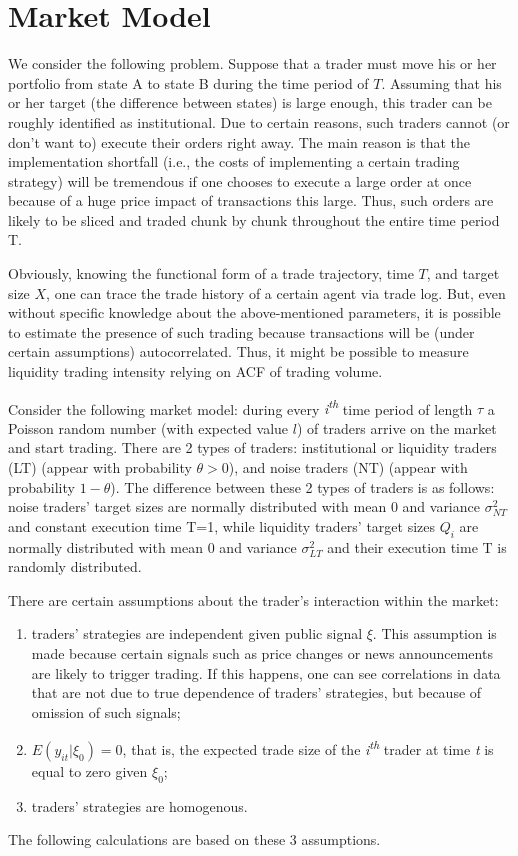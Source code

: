 \documentclass[12pt]{article}
\begin{document}
\section{Market Model}\label{sec:model}
We consider the following problem. Suppose that a trader must move his or her portfolio from state A to state B during the time period of $T$. Assuming that his or her target (the difference between states) is large enough, this trader can be roughly identified as institutional. Due to certain reasons, such traders cannot (or don't want to) execute their orders right away. The main reason is that the implementation shortfall (i.e., the costs of implementing a certain trading strategy) will be tremendous if one chooses to execute a large order at once because of a huge price impact of transactions this large. Thus, such orders are likely to be sliced and traded chunk by chunk throughout the entire time period T.

Obviously, knowing the functional form of a trade trajectory, time $T$, and target size $X$, one can trace the trade history of a certain agent via trade log. But, even without specific knowledge about the above-mentioned parameters, it is possible to estimate the presence of such trading because transactions will be (under certain assumptions) autocorrelated. Thus, it might be possible to measure liquidity trading intensity relying on ACF of trading volume.

Consider the following market model: during every \textit{i\textsuperscript{th}} time period of length $\tau$ a Poisson random number (with expected value $l$) of traders arrive on the market and start trading. There are 2 types of traders: institutional or liquidity traders (LT) (appear with probability $\theta> 0$), and noise traders (NT) (appear with probability $1-\theta$). The difference between these 2 types of traders is as follows: noise traders' target sizes are normally distributed with mean 0 and variance $\sigma^2_{NT}$ and constant execution time T=1, while liquidity traders' target sizes $Q_i$ are normally distributed with mean 0 and variance $\sigma^2_{LT}$ and their execution time T is randomly distributed. 

There are certain assumptions about the trader's interaction within the market: 
\begin{enumerate}
\item traders' strategies are independent given public signal $\xi$. This assumption is made because certain signals such as price changes or news announcements are likely to trigger trading. If this happens, one can see correlations in data that are not due to true dependence of traders' strategies, but because of omission of such signals;
\item $E(y_{it}\vert\xi_0)=0$, that is, the expected trade size of the \textit{i\textsuperscript{th}} trader at time \textit{t} is equal to zero given $\xi_0$;
\item traders' strategies are homogenous.
\end{enumerate}
The following calculations are based on these 3 assumptions. 
\end{document}
